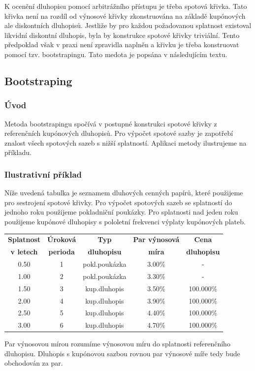 \documentclass[a4paper]{book}
\begin{document}
K ocenění dluhopisu pomocí arbitrážního přístupu je třeba spotová křivka. Tato křivka není na rozdíl od výnosové křivky zkonstruována na základě kupónových ale diskontních dluhopisů. Jestliže by pro každou požadovanou splatnost existoval likvidní diskontní dluhopis, byla by konstrukce spotové křivky triviální. Tento předpoklad však v praxi není zpravidla naplněn a křivku je třeba konstruovat pomocí tzv. bootstrapingu. Tato medota je popsána v následujícím textu.

\subsection{Bootstraping}

\subsubsection{Úvod}

Metoda bootstrapingu spočívá v postupné konstrukci spotové křivky z referenčních kupónových dluhopisů. Pro výpočet spotové sazby je zapotřebí znalost všech spotových sazeb s nižší splatností. Aplikaci metody ilustrujeme na příkladu.

\subsubsection{Ilustrativní příklad}

Níže uvedená tabulka je seznamem dluhových cenných papírů, které použijeme pro sestrojení spotové křivky. Pro výpočet spotových sazeb se splatností do jednoho roku použijeme pokladniční poukázky. Pro splatnosti nad jeden roku použijeme kupónové dluhopisy s pololetní frekvenci výplaty kupónových plateb.
\begin{center}
\begin{tabular}{c c c c c}
\textbf{Splatnost} & \textbf{Úroková} & \textbf{Typ} & \textbf{Par výnosová} & \textbf{Cena}\\
\textbf{v letech} & \textbf{perioda} & \textbf{dluhopisu} & \textbf{míra} & \textbf{dluhopisu}\\
\hline
0.50 & 1 & pokl.poukázka & 3.00\% & - \\
1.00 & 2 & pokl.poukázka & 3.30\% & - \\
1.50 & 3 & kup.dluhopis  & 3.50\% & 100.000\% \\
2.00 & 4 & kup.dluhopis  & 3.90\% & 100.000\% \\
2.50 & 5 & kup.dluhopis  & 4.40\% & 100.000\% \\		
3.00 & 6 & kup.dluhopis  & 4.70\% & 100.000\% \\
\end{tabular}
\end{center}
Par výnosovou mírou rozumíme výnosovou míru do splatnosti referenčního dluhopisu.  Dluhopis s kupónovou sazbou rovnou par výnosové míře tedy bude obchodován za par. 
\end{document}
